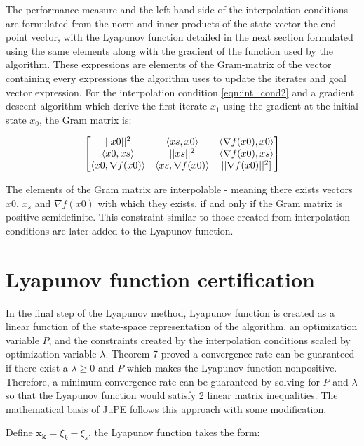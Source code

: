 The performance measure and the left hand side of the interpolation conditions are formulated from the norm and inner products of the state vector the end point vector, with the Lyapunov function detailed in the next section formulated using the same elements along with the gradient of the function used by the algorithm. These expressions are elements of the Gram-matrix of the vector containing every expressions the algorithm uses to update the iterates and goal vector expression. For the interpolation condition \ref{eqn:int_cond2} and a gradient descent algorithm which derive the first iterate $x_1$ using the gradient at the initial state $x_0$, the Gram matrix is:

\begin{equation} \label{eqn:trans_cond}
	\begin{bmatrix}||x0||^2 & \langle xs, x0 \rangle & \langle \nabla f(x0), x0 \rangle \\ \langle x0, xs \rangle & ||xs||^2 & \langle \nabla f(x0), xs \rangle \\ \langle x0, \nabla f(x0) \rangle & \langle xs, \nabla f(x0) \rangle & ||\nabla f(x0)||^2]\end{bmatrix}	
\end{equation}

The elements of the Gram matrix are interpolable - meaning there exists vectors $x0$, $x_s$ and $\nabla f(x0)$ with which they exists, if and only if the Gram matrix is positive semidefinite. This constraint similar to those created from interpolation conditions are later added to the Lyapunov function.

\section{Lyapunov function certification}

In the final step of the Lyapunov method, Lyapunov function is created as a linear function of the state-space representation of the algorithm, an optimization variable $P$, and the constraints created by the interpolation conditions scaled by optimization variable $\lambda$. Theorem 7 proved a convergence rate can be guaranteed if there exist a $\lambda \geq 0$ and $P$ which makes the Lyapunov function nonpositive. Therefore, a minimum convergence rate can be guaranteed by solving for $P$ and $\lambda$ so that the Lyapunov function would satisfy 2 linear matrix inequalities. The mathematical basis of JuPE follows this approach with some modification. 

Define $\mathbf{x_k} = \xi _k - \xi _s $, the Lyapunov function takes the form:

